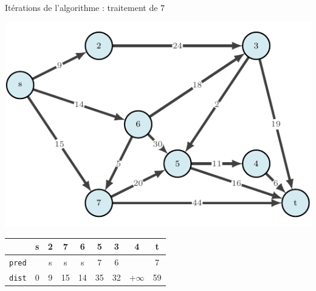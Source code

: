 \begin{frame}{Itérations de l'algorithme : traitement de $7$}
    \begin{center}
        \includegraphics[height=.6\textheight]{fig/dijkstra-0.pdf}      
    \begin{tabular}{c|cccccccc}
      
        & \textbf{s}   &\textbf{2}     &\textbf{7}     &\textbf{6}     &5      &3      &4      &t      \\
        \hline
        \texttt{pred} & &s      &s      &s      &7      &6      &       &7      \\
        \texttt{dist} & 0       &9      &15     &14     &35     &32     &$+\infty$    &59     \\
    \end{tabular}
\end{center}
\end{frame}

